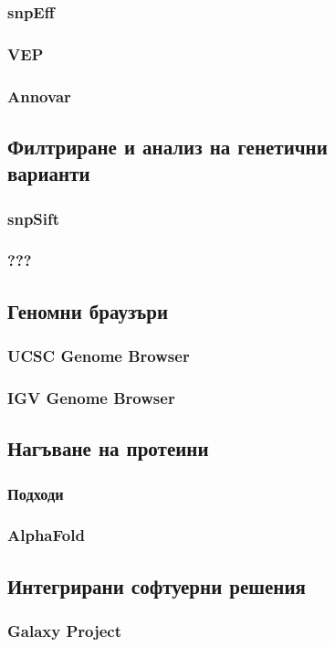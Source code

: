 \documentclass[pdftex,cyrillic,14pt,a4page,twoside]{extreport}
\begin{document}
\subsubsection{snpEff}
\subsubsection{VEP}
\subsubsection{Annovar}
\subsection[Филтриране и анализ на генетични варианти]{Филтриране и анализ на генетични\\ варианти}
\subsubsection{snpSift}
\subsubsection{???}
\subsection{Геномни браузъри}
\subsubsection{UCSC Genome Browser}
\subsubsection{IGV Genome Browser}
\subsection{Нагъване на протеини}
\subsubsection{Подходи}
\subsubsection{AlphaFold}
\subsection{Интегрирани софтуерни решения}
\subsubsection{Galaxy Project}
\end{document}
